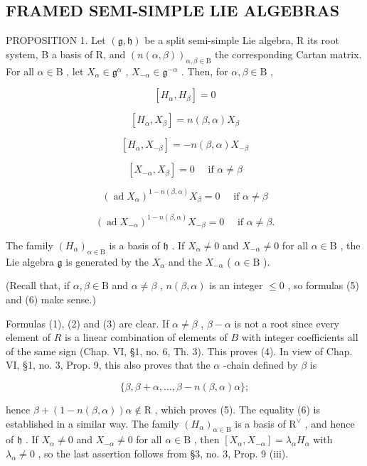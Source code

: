 \subsection{FRAMED SEMI-SIMPLE LIE ALGEBRAS}

PROPOSITION 1. Let \((\mathfrak{g},\mathfrak{h})\) be a split semi-simple Lie algebra, R its root system, B a basis of R, and \((n(\alpha ,\beta))_{\alpha ,\beta \in \mathrm{B}}\) the corresponding Cartan matrix. For all \(\alpha \in \mathrm{B}\) , let \(X_{\alpha}\in \mathfrak{g}^{\alpha}\) , \(X_{-\alpha}\in \mathfrak{g}^{-\alpha}\) . Then, for \(\alpha ,\beta \in \mathrm{B}\) ,

\[
[ H _ {\alpha}, H _ {\beta} ] = 0\tag{1}
\]

\[
[ H _ {\alpha}, X _ {\beta} ] = n (\beta , \alpha) X _ {\beta}\tag{2}
\]

\[
[ H _ {\alpha}, X _ {- \beta} ] = - n (\beta , \alpha) X _ {- \beta}\tag{3}
\]

\[
[ X _ {- \alpha}, X _ {\beta} ] = 0 \quad \text { if } \alpha \neq \beta\tag{4}
\]

\[
(\operatorname{ad} X _ {\alpha}) ^ {1 - n (\beta , \alpha)} X _ {\beta} = 0 \quad \text { if } \alpha \neq \beta\tag{5}
\]

\[
(\operatorname{ad} X _ {- \alpha}) ^ {1 - n (\beta , \alpha)} X _ {- \beta} = 0 \quad \text { if } \alpha \neq \beta .\tag{6}
\]

The family \((H_{\alpha})_{\alpha \in \mathrm{B}}\) is a basis of \(\mathfrak{h}\) . If \(X_{\alpha} \neq 0\) and \(X_{-\alpha} \neq 0\) for all \(\alpha \in \mathrm{B}\) , the Lie algebra \(\mathfrak{g}\) is generated by the \(X_{\alpha}\) and the \(X_{-\alpha}\) ( \(\alpha \in \mathrm{B}\) ).

(Recall that, if \(\alpha, \beta \in \mathrm{B}\) and \(\alpha \neq \beta\) , \(n(\beta, \alpha)\) is an integer \(\leq 0\) , so formulas (5) and (6) make sense.)

Formulas (1), (2) and (3) are clear. If \(\alpha \neq \beta\) , \(\beta - \alpha\) is not a root since every element of \(R\) is a linear combination of elements of \(B\) with integer coefficients all of the same sign (Chap. VI, §1, no. 6, Th. 3). This proves (4). In view of Chap. VI, §1, no. 3, Prop. 9, this also proves that the \(\alpha\) -chain defined by \(\beta\) is

\[
\{\beta , \beta + \alpha , \dots , \beta - n (\beta , \alpha) \alpha \};
\]

hence \(\beta + (1 - n(\beta, \alpha))\alpha \notin \mathrm{R}\) , which proves (5). The equality (6) is established in a similar way. The family \((H_{\alpha})_{\alpha \in \mathrm{B}}\) is a basis of \(\mathrm{R}^{\vee}\) , and hence of \(\mathfrak{h}\) . If \(X_{\alpha} \neq 0\) and \(X_{-\alpha} \neq 0\) for all \(\alpha \in \mathrm{B}\) , then \([X_{\alpha}, X_{-\alpha}] = \lambda_{\alpha}H_{\alpha}\) with \(\lambda_{\alpha} \neq 0\) , so the last assertion follows from §3, no. 3, Prop. 9 (iii).

